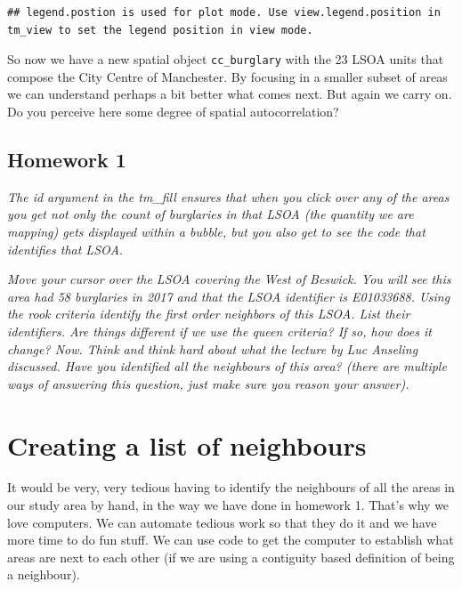 \documentclass[]{book}
\begin{document}
\begin{verbatim}
## legend.postion is used for plot mode. Use view.legend.position in tm_view to set the legend position in view mode.
\end{verbatim}

\hypertarget{htmlwidget-5833dbaf1148e5a6da4c}{}

So now we have a new spatial object \texttt{cc\_burglary} with the 23 LSOA units that compose the City Centre of Manchester. By focusing in a smaller subset of areas we can understand perhaps a bit better what comes next. But again we carry on. Do you perceive here some degree of spatial autocorrelation?

\hypertarget{homework-1-2}{%
\subsection{Homework 1}\label{homework-1-2}}

\emph{The id argument in the tm\_fill ensures that when you click over any of the areas you get not only the count of burglaries in that LSOA (the quantity we are mapping) gets displayed within a bubble, but you also get to see the code that identifies that LSOA.}

\emph{Move your cursor over the LSOA covering the West of Beswick. You will see this area had 58 burglaries in 2017 and that the LSOA identifier is E01033688. Using the rook criteria identify the first order neighbors of this LSOA. List their identifiers. Are things different if we use the queen criteria? If so, how does it change? Now. Think and think hard about what the lecture by Luc Anseling discussed. Have you identified all the neighbours of this area? (there are multiple ways of answering this question, just make sure you reason your answer).}

\hypertarget{creating-a-list-of-neighbours}{%
\section{Creating a list of neighbours}\label{creating-a-list-of-neighbours}}

It would be very, very tedious having to identify the neighbours of all the areas in our study area by hand, in the way we have done in homework 1. That's why we love computers. We can automate tedious work so that they do it and we have more time to do fun stuff. We can use code to get the computer to establish what areas are next to each other (if we are using a contiguity based definition of being a neighbour).
\end{document}
